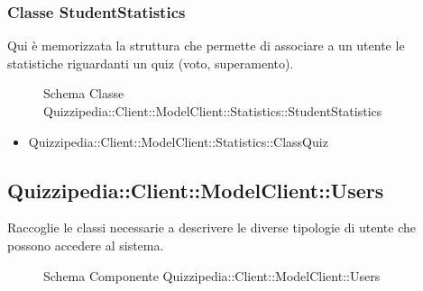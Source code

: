 \subsubsection{Classe StudentStatistics}
Qui è memorizzata la struttura che permette di associare a un utente le statistiche riguardanti un quiz (voto, superamento).
\begin{figure}[H]
\centering
\noindent{}
\caption[Schema Classe StudentStatistics]{Schema Classe Quizzipedia::Client::ModelClient::Statistics::StudentStatistics}
\end{figure}
\begin{itemize}
\item Quizzipedia::Client::ModelClient::Statistics::ClassQuiz
\end{itemize}
\subsection{Quizzipedia::Client::ModelClient::Users}
Raccoglie le classi necessarie a descrivere le diverse tipologie di utente che possono accedere al sistema.
\begin{figure}[H]
\centering
\noindent{}
\caption[Schema Componente Quizzipedia::Client::ModelClient::Users]{Schema Componente Quizzipedia::Client::ModelClient::Users}
\end{figure}
